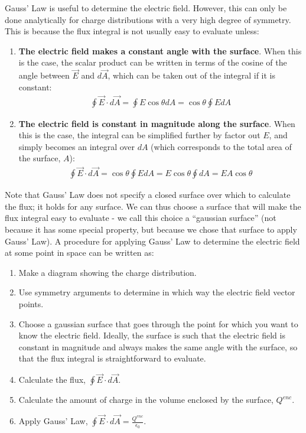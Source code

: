 \begin{chapterSummary}
Gauss' Law is useful to determine the electric field. However, this can only be done analytically for charge distributions with a very high degree of symmetry. This is because the flux integral is not usually easy to evaluate unless:
\begin{enumerate}
\item \textbf{The electric field makes a constant angle with the surface}. When this is the case, the scalar product can be written in terms of the cosine of the angle between $\vec E$ and $d\vec A$, which can be taken out of the integral if it is constant:
\begin{align*}
\oint \vec E\cdot d\vec A=\oint E\cos\theta dA=\cos\theta\oint EdA
\end{align*}
\item \textbf{The electric field is constant in magnitude along the surface}. When this is the case, the integral can be simplified further by factor out $E$, and simply becomes an integral over $dA$ (which corresponds to the total area of the surface, $A$):
\begin{align*}
\oint \vec E\cdot d\vec A=\cos\theta\oint EdA =E\cos\theta\oint dA=EA\cos\theta 
\end{align*}
\end{enumerate}
Note that Gauss' Law does not specify a closed surface over which to calculate the flux; it holds for any surface. We can thus choose a surface that will make the flux integral easy to evaluate - we call this choice a ``gaussian surface'' (not because it has some special property, but because we chose that surface to apply Gauss' Law). A procedure for applying Gauss' Law to determine the electric field at some point in space can be written as:
\begin{enumerate}
\item Make a diagram showing the charge distribution.
\item Use symmetry arguments to determine in which way the electric field vector points.
\item Choose a gaussian surface that goes through the point for which you want to know the electric field. Ideally, the surface is such that the electric field is constant in magnitude and always makes the same angle with the surface, so that the flux integral is straightforward to evaluate.
\item Calculate the flux, $\oint \vec E\cdot d\vec A$.
\item Calculate the amount of charge in the volume enclosed by the surface, $Q^{enc}$.
\item Apply Gauss' Law, $\oint \vec E\cdot d\vec A=\frac{Q^{enc}}{\epsilon_0} $.

\end{enumerate}
\end{chapterSummary}
